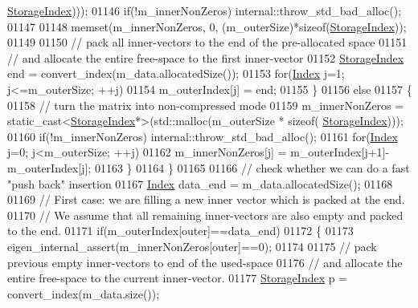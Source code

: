 \begin{DoxyCode}
      \hyperlink{group___sparse_core___module_a0b540ba724726ebe953f8c0df06081ed}{StorageIndex})));
01146       \textcolor{keywordflow}{if}(!m\_innerNonZeros) internal::throw\_std\_bad\_alloc();
01147       
01148       memset(m\_innerNonZeros, 0, (m\_outerSize)*\textcolor{keyword}{sizeof}(\hyperlink{group___sparse_core___module_a0b540ba724726ebe953f8c0df06081ed}{StorageIndex}));
01149       
01150       \textcolor{comment}{// pack all inner-vectors to the end of the pre-allocated space}
01151       \textcolor{comment}{// and allocate the entire free-space to the first inner-vector}
01152       \hyperlink{group___sparse_core___module_a0b540ba724726ebe953f8c0df06081ed}{StorageIndex} end = convert\_index(m\_data.allocatedSize());
01153       \textcolor{keywordflow}{for}(\hyperlink{group___core___module_a554f30542cc2316add4b1ea0a492ff02}{Index} j=1; j<=m\_outerSize; ++j)
01154         m\_outerIndex[j] = end;
01155     \}
01156     \textcolor{keywordflow}{else}
01157     \{
01158       \textcolor{comment}{// turn the matrix into non-compressed mode}
01159       m\_innerNonZeros = \textcolor{keyword}{static\_cast<}\hyperlink{group___sparse_core___module_a0b540ba724726ebe953f8c0df06081ed}{StorageIndex}*\textcolor{keyword}{>}(std::malloc(m\_outerSize * \textcolor{keyword}{sizeof}(
      \hyperlink{group___sparse_core___module_a0b540ba724726ebe953f8c0df06081ed}{StorageIndex})));
01160       \textcolor{keywordflow}{if}(!m\_innerNonZeros) internal::throw\_std\_bad\_alloc();
01161       \textcolor{keywordflow}{for}(\hyperlink{group___core___module_a554f30542cc2316add4b1ea0a492ff02}{Index} j=0; j<m\_outerSize; ++j)
01162         m\_innerNonZeros[j] = m\_outerIndex[j+1]-m\_outerIndex[j];
01163     \}
01164   \}
01165   
01166   \textcolor{comment}{// check whether we can do a fast "push back" insertion}
01167   \hyperlink{group___core___module_a554f30542cc2316add4b1ea0a492ff02}{Index} data\_end = m\_data.allocatedSize();
01168   
01169   \textcolor{comment}{// First case: we are filling a new inner vector which is packed at the end.}
01170   \textcolor{comment}{// We assume that all remaining inner-vectors are also empty and packed to the end.}
01171   \textcolor{keywordflow}{if}(m\_outerIndex[outer]==data\_end)
01172   \{
01173     eigen\_internal\_assert(m\_innerNonZeros[outer]==0);
01174     
01175     \textcolor{comment}{// pack previous empty inner-vectors to end of the used-space}
01176     \textcolor{comment}{// and allocate the entire free-space to the current inner-vector.}
01177     \hyperlink{group___sparse_core___module_a0b540ba724726ebe953f8c0df06081ed}{StorageIndex} p = convert\_index(m\_data.size());

\end{DoxyCode}
